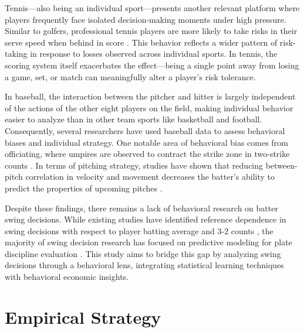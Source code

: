 \documentclass[12pt]{article}
\numberwithin{equation}{section}
\begin{document}
\vspace{5mm} %

Tennis---also being an individual sport---presents another relevant platform where players frequently face isolated decision-making moments under high pressure. Similar to golfers, professional tennis players are more likely to take risks in their serve speed when behind in score \parencite{anbarci_revisiting_2018}. This behavior reflects a wider pattern of risk-taking in response to losses observed across individual sports. In tennis, the scoring system itself exacerbates the effect---being a single point away from losing a game, set, or match can meaningfully alter a player's risk tolerance.

\vspace{5mm} %

In baseball, the interaction between the pitcher and hitter is largely independent of the actions of the other eight players on the field, making individual behavior easier to analyze than in other team sports like basketball and football. Consequently,  several researchers have used baseball data to assess behavioral biases and individual strategy. One notable area of behavioral bias comes from officiating, where umpires are observed to contract the strike zone in two-strike counts \parencite{green_what_2014}. In terms of pitching strategy, studies have shown that reducing between-pitch correlation in velocity and movement decreases the batter’s ability to predict the properties of upcoming pitches \parencite{healey_using_2017}. 

\vspace{5mm} %

Despite these findings, there remains a lack of behavioral research on batter swing decisions. While existing studies have identified reference dependence in swing decisions with respect to player batting average \parencite{yashiki_2020} and 3-2 counts \parencite{toma_over-swinging_2021}, the majority of swing decision research has focused on predictive modeling for plate discipline evaluation \parencite{aucoin_quantifying_2019, ciardiello_lets_2021, mould_quantifying_2022, yee_evaluating_2024}. This study aims to bridge this gap by analyzing swing decisions through a behavioral lens, integrating statistical learning techniques with behavioral economic insights.

\section{Empirical Strategy}
\end{document}
